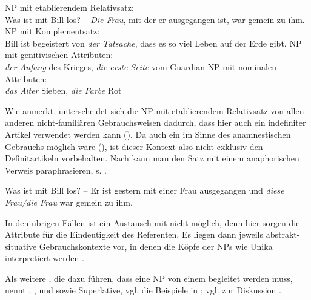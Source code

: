 \begin{exe} 
     \ex
     \begin{xlist}
 		\ex \label{etab} NP  mit etablierendem Relativsatz: \\ Was ist mit Bill los? -- \textit{Die Frau}, mit der er ausgegangen ist, war gemein zu ihm. 
		\ex \label{komp} NP  mit Komplementsatz: \\ Bill ist begeistert von \textit{der Tatsache}, dass es so viel Leben auf der Erde gibt. 
		\ex \label{gen-attr} NP  mit  genitivischen Attributen: \\ \textit{der Anfang} des Krieges, \textit{die erste Seite} vom Guardian
		\ex \label{n-attr} NP  mit nominalen Attributen: \\ \textit{das Alter} Sieben, \textit{die Farbe} Rot
    \end{xlist}
\end{exe}

Wie \textcite[38]{Himmelmann1997} anmerkt, unterscheidet sich die NP  mit etablierendem Relativsatz von allen anderen nicht-familiären Gebrauchsweisen dadurch, dass hier auch ein indefiniter Artikel  verwendet werden kann (). Da auch ein  im Sinne des anamnestischen  Gebrauchs möglich wäre (), ist dieser Kontext also nicht exklusiv den Definitartikeln vorbehalten. Nach \textcite[308]{Lobner1985} kann man den Satz mit einem anaphorischen  Verweis paraphrasieren, s. . %

\begin{exe}
	\ex \label{ex:bill} Was ist mit Bill los? -- Er ist gestern mit einer Frau ausgegangen und \textit{diese Frau/die Frau} war gemein zu ihm. 
\end{exe}

In den übrigen Fällen ist ein Austausch mit  nicht möglich, denn hier sorgen die Attribute für die Eindeutigkeit des Referenten. Es liegen dann jeweils abstrakt-situative  Gebrauchskontexte vor, in denen die Köpfe der NPs  wie Unika  interpretiert werden  \parencite[38]{Himmelmann1997}. 

Als weitere , die dazu führen, dass eine NP  von einem  begleitet werden muss, nennt  \textcite[148 und 228--230]{Hawkins1978} , ,  und  sowie  Superlative, vgl. die Beispiele in ; vgl. zur Diskussion \textcite[9]{Lyons1999}.

